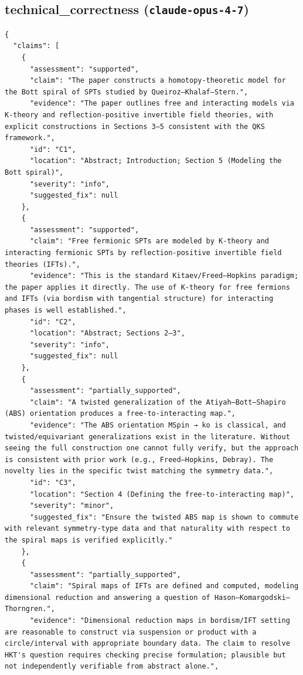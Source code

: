 \documentclass[11pt]{article}
\begin{document}
\subsection*{technical_correctness (\texttt{claude-opus-4-7})}
\begin{verbatim}
{
  "claims": [
    {
      "assessment": "supported",
      "claim": "The paper constructs a homotopy-theoretic model for the Bott spiral of SPTs studied by Queiroz–Khalaf–Stern.",
      "evidence": "The paper outlines free and interacting models via K-theory and reflection-positive invertible field theories, with explicit constructions in Sections 3–5 consistent with the QKS framework.",
      "id": "C1",
      "location": "Abstract; Introduction; Section 5 (Modeling the Bott spiral)",
      "severity": "info",
      "suggested_fix": null
    },
    {
      "assessment": "supported",
      "claim": "Free fermionic SPTs are modeled by K-theory and interacting fermionic SPTs by reflection-positive invertible field theories (IFTs).",
      "evidence": "This is the standard Kitaev/Freed–Hopkins paradigm; the paper applies it directly. The use of K-theory for free fermions and IFTs (via bordism with tangential structure) for interacting phases is well established.",
      "id": "C2",
      "location": "Abstract; Sections 2–3",
      "severity": "info",
      "suggested_fix": null
    },
    {
      "assessment": "partially_supported",
      "claim": "A twisted generalization of the Atiyah–Bott–Shapiro (ABS) orientation produces a free-to-interacting map.",
      "evidence": "The ABS orientation MSpin → ko is classical, and twisted/equivariant generalizations exist in the literature. Without seeing the full construction one cannot fully verify, but the approach is consistent with prior work (e.g., Freed–Hopkins, Debray). The novelty lies in the specific twist matching the symmetry data.",
      "id": "C3",
      "location": "Section 4 (Defining the free-to-interacting map)",
      "severity": "minor",
      "suggested_fix": "Ensure the twisted ABS map is shown to commute with relevant symmetry-type data and that naturality with respect to the spiral maps is verified explicitly."
    },
    {
      "assessment": "partially_supported",
      "claim": "Spiral maps of IFTs are defined and computed, modeling dimensional reduction and answering a question of Hason–Komargodski–Thorngren.",
      "evidence": "Dimensional reduction maps in bordism/IFT setting are reasonable to construct via suspension or product with a circle/interval with appropriate boundary data. The claim to resolve HKT's question requires checking precise formulation; plausible but not independently verifiable from abstract alone.",

\end{verbatim}
\end{document}
